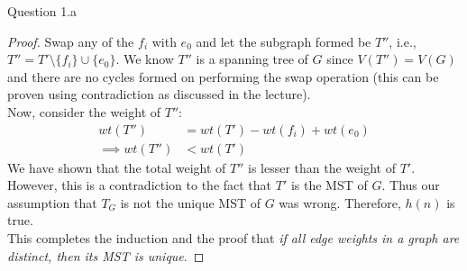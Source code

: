 \begin{solution}{Question 1.a}
\begin{proof}
        Swap any of the $f_i$ with $e_0$ and let the subgraph formed be $T''$, i.e., $T''=T'\setminus\{f_i\}\cup\{e_0\}$. We know $T''$ is a spanning tree of $G$ since $V(T'')=V(G)$ and there are no cycles formed on performing the swap operation (this can be proven using contradiction as discussed in the lecture).\\
        Now, consider the weight of $T''$:
        \begin{equation}
            \begin{split}
                wt(T'')&=wt(T')-wt(f_i)+wt(e_0)\\
                \implies wt(T'') &< wt(T')
            \end{split}
        \end{equation}
        We have shown that the total weight of $T''$ is lesser than the weight of $T'$. However, this is a contradiction to the fact that $T'$ is the MST of $G$. Thus our assumption that $T_G$ is not the unique MST of $G$ was wrong. Therefore, $h(n)$ is true.\\

        This completes the induction and the proof that \textit{if all edge weights in a graph are distinct, then its MST is unique}.
    \end{proof}
\end{solution}
